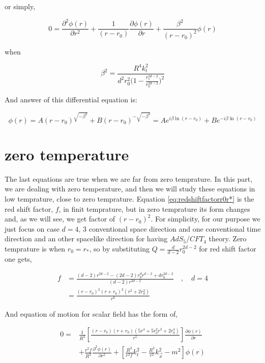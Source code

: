 or simply,

\begin{equation}
    0 = \frac{\partial^2 \phi(r)}{\partial r^2} + \frac{1}{(r-r_0)} \frac{\partial \phi(r)}{\partial r} + \frac{\beta^2}{(r-r_0)^2} \phi(r)
\end{equation}

when

\begin{equation}
    \beta^2 = \frac{R^4k^2_t}{d^2r_0^2\big(1-\frac{r^{2d-2}_*}{r^{2d-2}_0}\big)^2}
\end{equation}

And answer of this differential equation is:

\begin{equation} \label{eq:chargedblackholenearhorizonsolution}
    \phi(r) = A(r-r_0)^{ \sqrt{ - \beta^2}} + B(r-r_0)^{- \sqrt{-\beta^2}} = Ae^{ i\beta \ln{(r-r_0)}} + Be^{- i\beta\ln{(r-r_0)}} 
\end{equation}

\section{zero temperature}

The last equations are true when we are far from zero temprature. In this part, we are dealing with zero temperature, and then we will study these equations in low temprature, close to zero temprature. Equation \ref{eq:redshiftfactorr0r*} is the red shift factor, $f$, in finit temprature, but in zero temprature its form changes and, as we will see, we get factor of $(r-r_0)^2$. For simplicity, for our purpose we just focus on case $d = 4$, $3$ conventional space direction and one conventional time direction and an other spacelike direction for having $AdS_5/CFT_4$ theory. Zero temprature is when $r_0 = r_*$, so by substituting $Q = \frac{d}{d-2}r_0^{2d-2} $ for red shift factor one gets,

\begin{align} \label{eq:redshiftfactorr0r*zeroT}
    f &= \frac{(d-2)r^{2d-2} - (2d-2)r_0^{d}r^{d-2} + dr_0^{2d-2}}{(d-2)r^{2d-2}} \quad , \quad d = 4 \nonumber\\
      &= \frac{(r-r_0)^2(r+r_0)^2(r^2 + 2r_0^2)}{r^6}
\end{align}

And equation of motion for scalar field has the form of,

\begin{align} \label{eq:equationofmotionchargeblackholeinadsZetorT}
    0 =& \frac{1}{R^2}\left[\frac{(r-r_0)(r+r_0)(5r^4 + 5r_0^2r^2 + 2r_0^4)}{r^5}\right]\frac{\partial \phi(r)}{\partial r} \nonumber\\
      &+ \frac{r^2f}{R^2}\frac{\partial^2\phi(r)}{\partial r^2} + \left[ \frac{R^2}{r^2f}k^2_t-\frac{R^2}{r^2}k^2_{\vec{x}}-m^2\right]\phi(r)
\end{align} 

